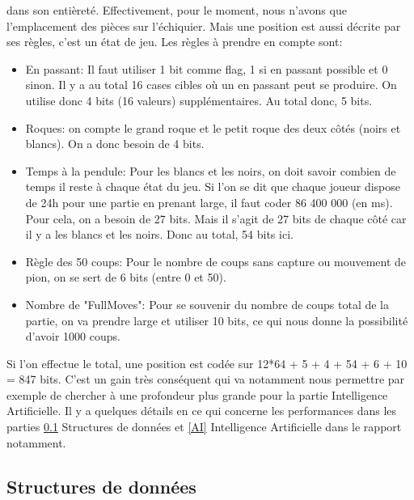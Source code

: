 \documentclass{article}
\begin{document}
dans son entièreté. Effectivement, pour le moment, nous n'avons que l'emplacement des pièces sur l'échiquier. Mais une position
est aussi décrite par ses règles, c'est un état de jeu. Les règles à prendre en compte sont:\\
\begin{itemize}
    \item En passant: Il faut utiliser 1 bit comme flag, 1 si en passant possible et 0 sinon. Il y a au total 16 cases cibles où
    un en passant peut se produire. On utilise donc 4 bits (16 valeurs) supplémentaires. Au total donc, 5 bits.
    \item Roques: on compte le grand roque et le petit roque des deux côtés (noirs et blancs). On a donc besoin de 4 bits.
    \item Temps à la pendule: Pour les blancs et les noirs, on doit savoir combien de temps il reste à chaque état du jeu. Si
    l'on se dit que chaque joueur dispose de 24h pour une partie en prenant large, il faut coder 86 400 000 (en ms). Pour cela,
    on a besoin de 27 bits. Mais il s'agit de 27 bits de chaque côté car il y a les blancs et les noirs. Donc au total, 54 bits ici.
    \item Règle des 50 coups: Pour le nombre de coups sans capture ou mouvement de pion, on se sert de 6 bits (entre 0 et 50).
    \item Nombre de "FullMoves": Pour se souvenir du nombre de coups total de la partie, on va prendre large et utiliser 10 bits,
    ce qui nous donne la possibilité d'avoir 1000 coups.
\end{itemize}

Si l'on effectue le total, une position est codée sur 12*64 + 5 + 4 + 54 + 6 + 10 = 847 bits.
C'est un gain très conséquent qui va notamment nous permettre par exemple de chercher à une profondeur plus grande pour la partie
Intelligence Artificielle. Il y a quelques détails en ce qui concerne les performances dans les parties \ref{DataStruct} Structures de données et
\ref{AI} Intelligence Artificielle dans le rapport notamment.

\subsection{Structures de données}
\label{DataStruct}
\end{document}

